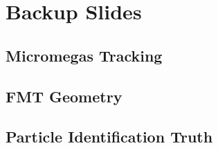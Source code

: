 \section*{}
\begin{frame}{}
    \centering \Huge{}
\end{frame}

\section*{Backup Slides}
\subsection*{Micromegas Tracking}


\subsection*{FMT Geometry}


\subsection*{Particle Identification Truth}


% 

% 

% 

% 

% 

